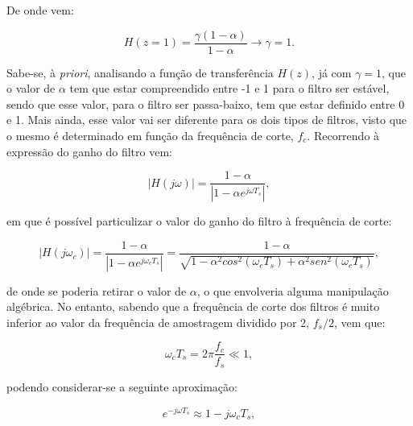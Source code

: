 \documentclass[11pt]{article}
\numberwithin{equation}{section}
\begin{document}
\vspace{1mm}
De onde vem:

\vspace{-3mm}
\begin{equation}
	H(z = 1) = \frac{\gamma(1-\alpha)}{1-\alpha} \longrightarrow \gamma = 1.
\end{equation} 

\vspace{1mm}
Sabe-se, à \textit{priori}, analisando a função de transferência $H(z)$, já com $\gamma = 1$, que o valor de $\alpha$ tem que estar compreendido entre -1 e 1 para o filtro ser estável, sendo que esse valor, para o filtro ser passa-baixo, tem que estar definido entre 0 e 1. Mais ainda, esse valor vai ser diferente para os dois tipos de filtros, visto que o mesmo é determinado em função da frequência de corte, \textit{$f_c$}. Recorrendo à expressão do ganho do filtro vem:

\vspace{-3mm}
\begin{equation}
	|H(j\omega)| = \frac{1-\alpha}{|1-\alpha e^{j\omega T_s}|},
\end{equation} 

\vspace{1mm}
em que é possível particulizar o valor do ganho do filtro à frequência de corte:

\vspace{-3mm}
\begin{equation}
	|H(j\omega_c)| = \frac{1-\alpha}{|1-\alpha e^{j\omega_c T_s}|} = \frac{1 - \alpha}{\sqrt{1- \alpha^2 cos^2{(\omega_c T_s)} + \alpha^2 sen^2{(\omega_c T_s)}}},
\end{equation} 

\vspace{1mm}
de onde se poderia retirar o valor de $\alpha$, o que envolveria alguma manipulação algébrica. No entanto, sabendo que a frequência de corte dos filtros é muito inferior ao valor da frequência de amostragem dividido por 2, $f_s/2$, vem que:

\vspace{-3mm}
\begin{equation}
\omega_ c T_s = 2\pi \frac{f_c}{f_s} \ll 1,
\end{equation} 

\vspace{1mm}
podendo considerar-se a seguinte aproximação:

\vspace{-3mm}
\begin{equation}
e^{-j\omega T_s} \approx 1 - j\omega_c T_s,
\end{equation} 
\end{document}
